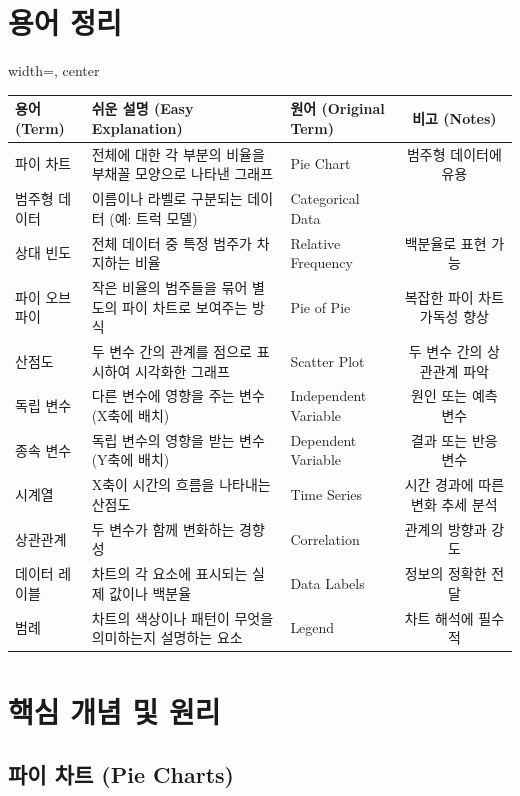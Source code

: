 \documentclass[11pt,a4paper]{article}
\theoremstyle{definition}
\begin{document}
\section{용어 정리}

\begin{adjustbox}{width=\textwidth, center}
\begin{tabular}{lllc}
\toprule
\textbf{용어 (Term)} & \textbf{쉬운 설명 (Easy Explanation)} & \textbf{원어 (Original Term)} & \textbf{비고 (Notes)} \\
\midrule
파이 차트 & 전체에 대한 각 부분의 비율을 부채꼴 모양으로 나타낸 그래프 & Pie Chart & 범주형 데이터에 유용 \\
범주형 데이터 & 이름이나 라벨로 구분되는 데이터 (예: 트럭 모델) & Categorical Data & \\
상대 빈도 & 전체 데이터 중 특정 범주가 차지하는 비율 & Relative Frequency & 백분율로 표현 가능 \\
파이 오브 파이 & 작은 비율의 범주들을 묶어 별도의 파이 차트로 보여주는 방식 & Pie of Pie & 복잡한 파이 차트 가독성 향상 \\
산점도 & 두 변수 간의 관계를 점으로 표시하여 시각화한 그래프 & Scatter Plot & 두 변수 간의 상관관계 파악 \\
독립 변수 & 다른 변수에 영향을 주는 변수 (X축에 배치) & Independent Variable & 원인 또는 예측 변수 \\
종속 변수 & 독립 변수의 영향을 받는 변수 (Y축에 배치) & Dependent Variable & 결과 또는 반응 변수 \\
시계열 & X축이 시간의 흐름을 나타내는 산점도 & Time Series & 시간 경과에 따른 변화 추세 분석 \\
상관관계 & 두 변수가 함께 변화하는 경향성 & Correlation & 관계의 방향과 강도 \\
데이터 레이블 & 차트의 각 요소에 표시되는 실제 값이나 백분율 & Data Labels & 정보의 정확한 전달 \\
범례 & 차트의 색상이나 패턴이 무엇을 의미하는지 설명하는 요소 & Legend & 차트 해석에 필수적 \\
\bottomrule
\end{tabular}
\end{adjustbox}

\newpage
\section{핵심 개념 및 원리}

\subsection{파이 차트 (Pie Charts)}
\end{document}

